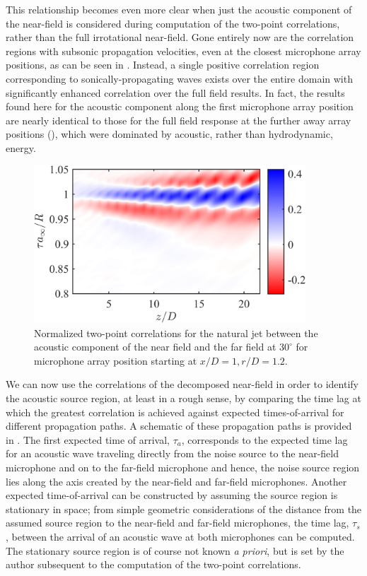 This relationship becomes even more clear when just the acoustic component of the near-field is considered during computation of the two-point correlations, rather than the full irrotational near-field. 
Gone entirely now are the correlation regions with subsonic propagation velocities, even at the closest microphone array positions, as can be seen in .
Instead, a single positive correlation region corresponding to sonically-propagating waves exists over the entire domain with significantly enhanced correlation over the full field results. 
In fact, the results found here for the acoustic component along the first microphone array position are nearly identical to those for the full field response at the further away array positions (), which were dominated by acoustic, rather than hydrodynamic, energy.
\begin{figure}
	\centering
	\includegraphics[width=4in]{Figures/ch3_St000_xcorr_acoustic.png}
	\caption{Normalized two-point correlations for the natural jet between the acoustic component of the near field and the far field at $30^\circ$ for microphone array position starting at $x/D = 1, r/D = 1.2$. }
	\label{fig:ch3_St000_acoustic}
\end{figure}

We can now use the correlations of the decomposed near-field in order to identify the acoustic source region, at least in a rough sense, by comparing the time lag at which the greatest correlation is achieved against expected times-of-arrival for different propagation paths.
A schematic of these propagation paths is provided in .
The first expected time of arrival, $\tau_a$, corresponds to the expected time lag for an acoustic wave traveling directly from the noise source to the near-field microphone and on to the far-field microphone and hence, the noise source region lies along the axis created by the near-field and far-field microphones.
Another expected time-of-arrival can be constructed by assuming the source region is stationary in space; from simple geometric considerations of the distance from the assumed source region to the near-field and far-field microphones, the time lag, $\tau_s$, between the arrival of an acoustic wave at both microphones can be computed.
The stationary source region is of course not known \textit{a priori}, but is set by the author subsequent to the computation of the two-point correlations.

